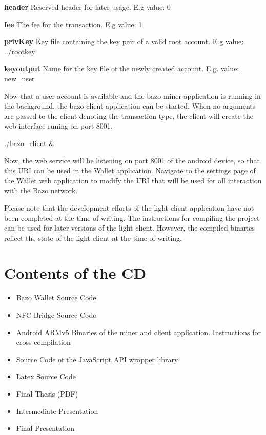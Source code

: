 \textbf{header}  Reserved header for later usage. E.g value: 0

\textbf{fee}  The fee for the transaction. E.g value: 1

\textbf{privKey} Key file containing the key pair of a valid root account. E.g value: ../rootkey

\textbf{keyoutput} Name for the key file of the newly created account. E.g. value: new\_user

Now that a user account is available and the bazo miner application is running in the background, the bazo client application can be started. When no arguments are passed to the client denoting the transaction type, the client will create the web interface runing on port 8001.
\begin{framed}
./bazo\_client \&
\end{framed}
Now, the web service will be listening on port 8001 of the android device, so that this URI can be used in the Wallet application. Navigate to the settings page of the Wallet web application to modify the URI that will be used for all  interaction with the Bazo network.

Please note that the development efforts of the light client application have not been completed at the time of writing. The instructions for compiling the project can be used for later versions of the light client. However, the compiled binaries reflect the state of the light client at the time of writing.

\chapter{Contents of the CD}
\begin{itemize}
\item Bazo Wallet Source Code
\item NFC Bridge Source Code
\item Android ARMv5 Binaries of the miner and client application. Instructions for cross-compilation
\item Source Code of the JavaScript API wrapper library
\item Latex Source Code
\item Final Thesis (PDF)
\item Intermediate Presentation
\item Final Presentation

\end{itemize}